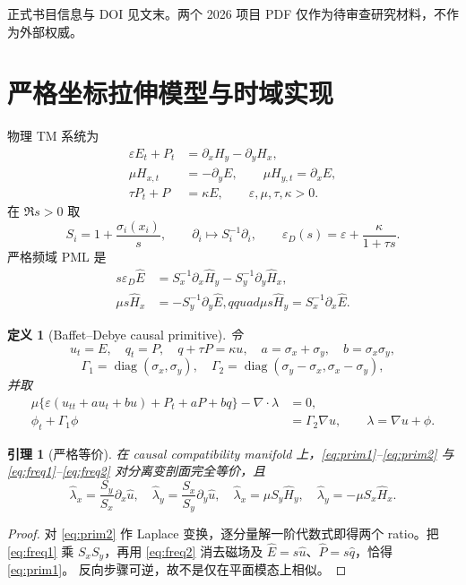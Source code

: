 \documentclass[UTF8,a4paper,11pt]{ctexart}
\newtheorem{definition}{定义}
\newtheorem{lemma}{引理}
\newcommand{\sx}{\sigma_x}
\newcommand{\sy}{\sigma_y}
\newcommand{\ep}{\varepsilon}
\begin{document}
正式书目信息与 DOI 见文末。两个 2026 项目 PDF 仅作为待审查研究材料，不作为外部权威。

\section{严格坐标拉伸模型与时域实现}

物理 TM 系统为
\begin{align}
 \ep E_t+P_t&=\partial_xH_y-\partial_yH_x,\label{eq:phys1}\\
 \mu H_{x,t}&=-\partial_yE,\qquad \mu H_{y,t}=\partial_xE,\label{eq:phys2}\\
 \tau P_t+P&=\kappa E,\qquad \ep,\mu,\tau,\kappa>0.\label{eq:debye}
\end{align}
在 $\Re s>0$ 取
\[
 S_i=1+\frac{\sigma_i(x_i)}s,\qquad \partial_i\mapsto S_i^{-1}\partial_i,
 \qquad \ep_D(s)=\ep+\frac\kappa{1+\tau s}.
\]
严格频域 PML 是
\begin{align}
 s\ep_D\widehat E&=S_x^{-1}\partial_x\widehat H_y-S_y^{-1}\partial_y\widehat H_x,\label{eq:freq1}\\
 \mu s\widehat H_x&=-S_y^{-1}\partial_y\widehat E,qquad
 \mu s\widehat H_y=S_x^{-1}\partial_x\widehat E.\label{eq:freq2}
\end{align}

\begin{definition}[Baffet--Debye causal primitive]
令
\[
 u_t=E,\quad q_t=P,\quad q+\tau P=\kappa u,
\quad a=\sx+\sy,\quad b=\sx\sy,
\]
\[
 \Gamma_1=\operatorname{diag}(\sx,\sy),\quad
 \Gamma_2=\operatorname{diag}(\sy-\sx,\sx-\sy),
\]
并取
\begin{align}
 \mu\{\ep(u_{tt}+au_t+bu)+P_t+aP+bq\}-\nabla\cdot\lambda&=0,\label{eq:prim1}\\
 \phi_t+\Gamma_1\phi&=\Gamma_2\nabla u,\qquad \lambda=\nabla u+\phi.\label{eq:prim2}
\end{align}
\end{definition}

\begin{lemma}[严格等价]
在 causal compatibility manifold 上，\eqref{eq:prim1}--\eqref{eq:prim2} 与
\eqref{eq:freq1}--\eqref{eq:freq2} 对分离变剖面完全等价，且
\[
 \widehat\lambda_x=\frac{S_y}{S_x}\partial_x\widehat u,
 \quad \widehat\lambda_y=\frac{S_x}{S_y}\partial_y\widehat u,
 \quad \widehat\lambda_x=\mu S_y\widehat H_y,
 \quad \widehat\lambda_y=-\mu S_x\widehat H_x.
\]
\end{lemma}
\begin{proof}
对 \eqref{eq:prim2} 作 Laplace 变换，逐分量解一阶代数式即得两个 ratio。把
\eqref{eq:freq1} 乘 $S_xS_y$，再用 \eqref{eq:freq2} 消去磁场及
$\widehat E=s\widehat u$、$\widehat P=s\widehat q$，恰得 \eqref{eq:prim1}。
反向步骤可逆，故不是仅在平面模态上相似。
\end{proof}
\end{document}
